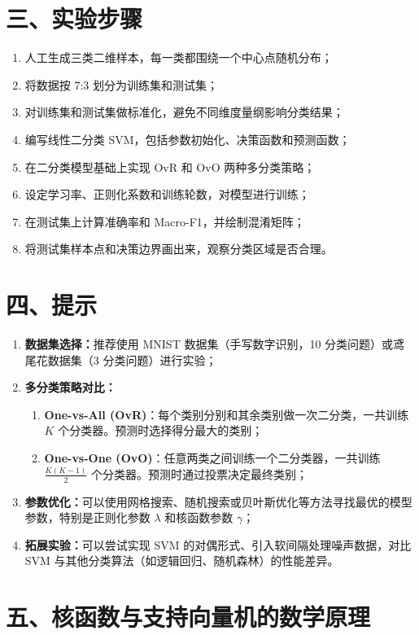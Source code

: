 \documentclass[12pt,a4paper]{ctexart}
\begin{document}
	\section*{三、实验步骤}
	\begin{enumerate}
		\item 人工生成三类二维样本，每一类都围绕一个中心点随机分布；
		\item 将数据按 7:3 划分为训练集和测试集；
		\item 对训练集和测试集做标准化，避免不同维度量纲影响分类结果；
		\item 编写线性二分类 SVM，包括参数初始化、决策函数和预测函数；
		\item 在二分类模型基础上实现 OvR 和 OvO 两种多分类策略；
		\item 设定学习率、正则化系数和训练轮数，对模型进行训练；
		\item 在测试集上计算准确率和 Macro-F1，并绘制混淆矩阵；
		\item 将测试集样本点和决策边界画出来，观察分类区域是否合理。
	\end{enumerate}
	
	\section*{四、提示}
	\begin{enumerate}
		\item \textbf{数据集选择：}推荐使用 MNIST 数据集（手写数字识别，10 分类问题）或鸢尾花数据集（3 分类问题）进行实验；
		\item \textbf{多分类策略对比：}
		\begin{enumerate}
			\item[(1)] \textbf{One-vs-All (OvR)}：每个类别分别和其余类别做一次二分类，一共训练 $K$ 个分类器。预测时选择得分最大的类别；
			\item[(2)] \textbf{One-vs-One (OvO)}：任意两类之间训练一个二分类器，一共训练 $\frac{K(K-1)}{2}$ 个分类器。预测时通过投票决定最终类别；
		\end{enumerate}
		\item \textbf{参数优化：}可以使用网格搜索、随机搜索或贝叶斯优化等方法寻找最优的模型参数，特别是正则化参数 $\lambda$ 和核函数参数 $\gamma$；
		\item \textbf{拓展实验：}可以尝试实现 SVM 的对偶形式、引入软间隔处理噪声数据，对比 SVM 与其他分类算法（如逻辑回归、随机森林）的性能差异。
	\end{enumerate}
	
	\section*{五、核函数与支持向量机的数学原理}
	
\end{document}
